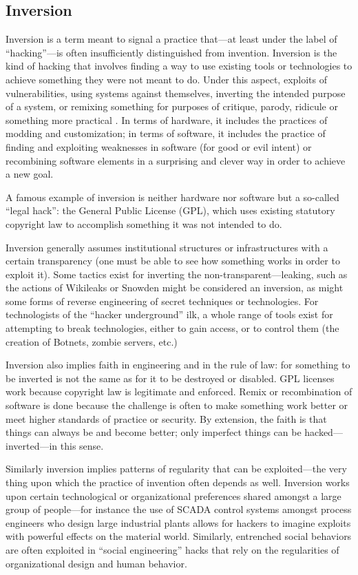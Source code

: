 \documentclass[10pt,letter,oneside]{scrartcl}
\begin{document}
\subsection{Inversion}

Inversion is a term meant to signal a practice that---at least under the label
of ``hacking''---is often insufficiently distinguished from invention.
Inversion is the kind of hacking that involves finding a way to use existing
tools or technologies to achieve something they were not meant to do.  Under
this aspect, exploits of vulnerabilities, using systems against themselves,
inverting the intended purpose of a system, or remixing something for purposes
of critique, parody, ridicule or something more practical
\cite{galloway2007exploit}.  In terms of hardware, it includes the practices of
modding and customization; in terms of software, it includes the practice of
finding and exploiting weaknesses in software (for good or evil intent) or
recombining software elements in a surprising and clever way in order to achieve
a new goal.

A famous example of inversion is neither hardware nor software but a so-called
``legal hack'': the General Public License (GPL), which uses existing statutory
copyright law to accomplish something it was not intended to do.

Inversion generally assumes institutional structures or infrastructures with a
certain transparency (one must be able to see how something works in order to
exploit it).  Some tactics exist for inverting the non-transparent---leaking,
such as the actions of Wikileaks or Snowden might be considered an inversion, as
might some forms of reverse engineering of secret techniques or technologies.
For technologists of the ``hacker underground'' ilk, a whole range of tools exist 
for attempting to break technologies, either to gain access, or to control them (the
creation of Botnets, zombie servers, etc.) 

Inversion also implies faith in engineering and in the rule of law: for
something to be inverted is not the same as for it to be destroyed or disabled.
GPL licenses work because copyright law is legitimate and enforced.  Remix or
recombination of software is done because the challenge is often to make
something work better or meet higher standards of practice or security.  By
extension, the faith is that things can always be and become better; only
imperfect things can be hacked--- inverted---in this sense.

Similarly inversion implies patterns of regularity that can be exploited---the
very thing upon which the practice of invention often depends as well.
Inversion works upon certain technological or organizational preferences shared
amongst a large group of people---for instance the use of SCADA control systems
amongst process engineers who design large industrial plants allows for hackers
to imagine exploits with powerful effects on the material world.  Similarly,
entrenched social behaviors are often exploited in ``social engineering'' hacks
that rely on the regularities of organizational design and human behavior.
\end{document}
